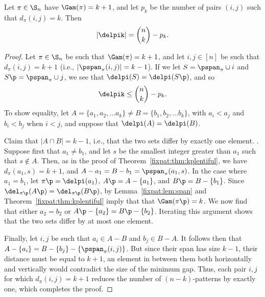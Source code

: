 \documentclass[12pt,twoside]{memoir}
\begin{document}
    \begin{theorem} \label{fixpat:thm:gappairs}
      Let $\pi \in \S_{n}$ have $\Gam(\pi) = k + 1$, and let $p_k$ be the number
      of pairs $(i,j)$ such that $d_\pi(i,j) = k$. Then 
      $$ | \delpik | = \binom{n}{k} - p_k.$$
    \end{theorem}
    \begin{proof}
      Let $\pi \in \S_n$ be such that $\Gam(\pi) = k+1$, and let $i,j \in [n]$ be
      such that $d_\pi(i,j) = k+1$ (i.e., $|\pspan_\pi(i,j)| = k-1$). If we let
      $S = \pspan_\pi \cup i$ and $S\p = \pspan_\pi \cup j$, we see that
      $\delpi(S) = \delpi(S\p)$, and so 
      $$\delpik \leq \binom{n}{k} - p_k. $$
      To show equality, let $A = \{a_1, a_2, \dots a_k\} \neq B = \{b_1, b_2,
      \dots b_k\}$, with $a_i < a_j$ and $b_i < b_j$ when $i < j$, and suppose
      that $\delpi(A) = \delpi(B)$. 
      
      Claim that $|A \cap B| = k-1$, i.e., that the two sets differ by exactly
      one element. .  Suppose first that $a_1 \neq b_1$, and let $s$ be the
      smallest integer greater than $a_1$ such that $s \notin A$. Then, as in the
      proof of Theorem~\ref{fixpat:thm:kplentiful}, we have $d_\pi(a_1, s) = k+1$, and
      $A - {a_1} = B - {b_1} = \pspan_\pi(a_1, s)$.  In the case where $a_1 =
      b_1$, let $\pi\p = \delpi(a_1)$, $A\p = A - \{a_1\}$, and $B\p = B -
      \{b_1\}$. Since $\del_{\pi\p} (A\p) = \del_{\pi\p}(B\p)$, by
      Lemma~\ref{fixpat:lem:span} and Theorem~\ref{fixpat:thm:kplentiful} imply that that
      $\Gam(\pi\p) = k$. We now find that either $a_2 = b_2$ or $A\p - \{a_2\} =
      B\p - \{b_2\}$. Iterating this argument shows that the two sets differ by
      at most one element. 

      Finally, let $i,j$ be such that $a_i \in A - B$ and $b_j \in B - A$. It
      follows then that $ A-\{a_i\} = B - \{b_j\} - \{\pspan_\pi(i,j) \}$. But
      since their span has size $k-1$, their distance must be equal to $k+1$,
      an element in between them both horizontally and vertically would
      contradict the size of the minimum gap. Thus, each pair $i,j$ for which
      $d_\pi(i,j) = k+1$ reduces the number of $(n-k)$-patterns by exactly one,
      which completes the proof. 
    \end{proof}




\end{document}
